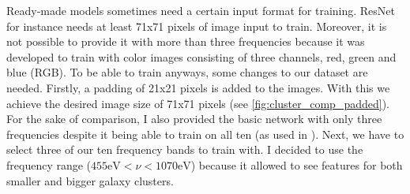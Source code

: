 Ready-made models sometimes need a certain input format for training. ResNet for instance needs at least 71x71 pixels of image input to train. Moreover, it is not possible to provide it with more than three frequencies because it was developed to train with color images consisting of three channels, red, green and blue (RGB). To be able to train anyways, some changes to our dataset are needed. Firstly, a padding of 21x21 pixels is added to the images. With this we achieve the desired image size of 71x71 pixels (see \autoref{fig:cluster_comp_padded}). For the sake of comparison, I also provided the basic network with only three frequencies despite it being able to train on all ten (as used in \citet{Krippendorf_2023}). Next, we have to select three of our ten frequency bands to train with. I decided to use the frequency range ($455\text{eV} < \nu < 1070\text{eV}$) because it allowed to see features for both smaller and bigger galaxy clusters. 


